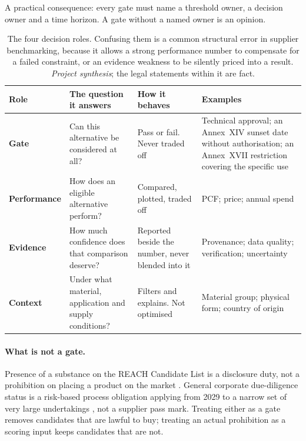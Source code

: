 \documentclass[10pt,twocolumn,a4paper]{article}
\newcommand{\dimhead}[1]{\textbf{#1}}
\begin{document}
A practical consequence: every gate must name a threshold owner, a decision owner
and a time horizon. A gate without a named owner is an opinion.

\begin{table}[t]
  \caption{The four decision roles. Confusing them is a common structural
  error in supplier benchmarking, because it allows a strong performance number to
  compensate for a failed constraint, or an evidence weakness to be silently
  priced into a result. \emph{Project synthesis}; the legal statements within it
  are fact.}
  \label{tab:roles}
  \small
  \begin{tabular}{@{}p{}p{}p{}p{}@{}}
    \toprule
    \dimhead{Role} & \dimhead{The question it answers} & \dimhead{How it behaves} & \dimhead{Examples} \\
    \midrule
    \textcolor{ink}{\textbf{Gate}} & Can this alternative be considered at all? & Pass or fail. Never traded off & Technical approval; an Annex~XIV sunset date without authorisation; an Annex~XVII restriction covering the specific use \\
    \textcolor{pblue}{\textbf{Performance}} & How does an eligible alternative perform? & Compared, plotted, traded off & PCF; price; annual spend \\
    \textcolor{pamber}{\textbf{Evidence}} & How much confidence does that comparison deserve? & Reported beside the number, never blended into it & Provenance; data quality; verification; uncertainty \\
    \textcolor{ink3}{\textbf{Context}} & Under what material, application and supply conditions? & Filters and explains. Not optimised & Material group; physical form; country of origin \\
    \bottomrule
  \end{tabular}
\end{table}

\paragraph{What is not a gate.} Presence of a substance on the REACH Candidate
List is a disclosure duty, not a prohibition on placing a product on the market
\cite{v2}. General corporate due-diligence status is a risk-based process
obligation applying from 2029 to a narrow set of very large undertakings
\cite{p5,v1}, not a supplier pass mark. Treating either as a gate removes
candidates that are lawful to buy; treating an actual prohibition as a scoring
input keeps candidates that are not.
\end{document}
